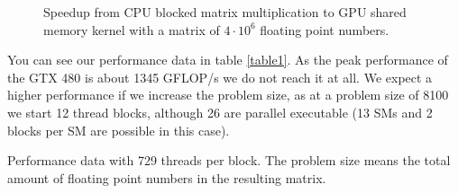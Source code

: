 \documentclass[DIV=12,oneside,a4paper]{scrartcl}
\begin{document}
\begin{figure}
    \begin{center}
        
    \end{center}
    \caption{Speedup from CPU blocked matrix multiplication to 
        GPU shared memory kernel with a matrix of $4\cdot 10^{6}$
        floating point numbers.}
    \label{fig:thread_speedup}
\end{figure}

You can see our performance data in table \ref{table1}.
As the peak performance of the GTX 480 is about 1345 GFLOP/s
we do not reach it at all. We expect a higher performance
if we increase the problem size, as at a problem size of 8100
we start 12 thread blocks, although 26 are parallel executable
(13 SMs and 2 blocks per SM are possible in this case).

\begin{table}
    \begin{center}
    
    \end{center}
    \caption{Performance data with 729 threads per block.
        The problem size means the total amount of floating
        point numbers in the resulting matrix.}
    \label{table1}
\end{table}
\end{document}
